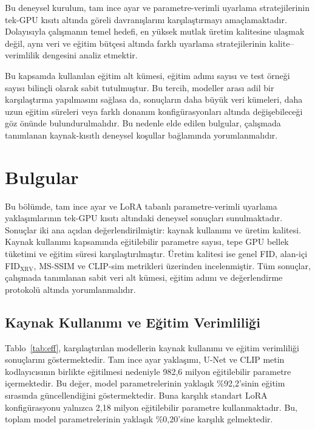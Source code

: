 \documentclass[11pt]{article}
\begin{document}
Bu deneysel kurulum, tam ince ayar ve parametre-verimli uyarlama stratejilerinin
tek-GPU kısıtı altında göreli davranışlarını karşılaştırmayı amaçlamaktadır.
Dolayısıyla çalışmanın temel hedefi, en yüksek mutlak üretim kalitesine ulaşmak
değil, aynı veri ve eğitim bütçesi altında farklı uyarlama stratejilerinin
kalite--verimlilik dengesini analiz etmektir.

Bu kapsamda kullanılan eğitim alt kümesi, eğitim adımı sayısı ve test örneği
sayısı bilinçli olarak sabit tutulmuştur. Bu tercih, modeller arası adil bir
karşılaştırma yapılmasını sağlasa da, sonuçların daha büyük veri kümeleri,
daha uzun eğitim süreleri veya farklı donanım konfigürasyonları altında
değişebileceği göz önünde bulundurulmalıdır. Bu nedenle elde edilen bulgular,
çalışmada tanımlanan kaynak-kısıtlı deneysel koşullar bağlamında
yorumlanmalıdır.


\section{Bulgular}
\label{sec:results}

Bu bölümde, tam ince ayar ve LoRA tabanlı parametre-verimli uyarlama
yaklaşımlarının tek-GPU kısıtı altındaki deneysel sonuçları sunulmaktadır.
Sonuçlar iki ana açıdan değerlendirilmiştir: kaynak kullanımı ve üretim
kalitesi. Kaynak kullanımı kapsamında eğitilebilir parametre sayısı, tepe GPU
bellek tüketimi ve eğitim süresi karşılaştırılmıştır. Üretim kalitesi ise genel
FID, alan-içi FID$_{\text{XRV}}$, MS-SSIM ve CLIP-sim metrikleri üzerinden
incelenmiştir. Tüm sonuçlar, çalışmada tanımlanan sabit veri alt kümesi, eğitim
adımı ve değerlendirme protokolü altında yorumlanmalıdır.

\subsection{Kaynak Kullanımı ve Eğitim Verimliliği}

Tablo~\ref{tab:eff}, karşılaştırılan modellerin kaynak kullanımı ve eğitim
verimliliği sonuçlarını göstermektedir. Tam ince ayar yaklaşımı, U-Net ve CLIP
metin kodlayıcısının birlikte eğitilmesi nedeniyle 982,6 milyon eğitilebilir
parametre içermektedir. Bu değer, model parametrelerinin yaklaşık \%92,2'sinin
eğitim sırasında güncellendiğini göstermektedir. Buna karşılık standart LoRA
konfigürasyonu yalnızca 2,18 milyon eğitilebilir parametre kullanmaktadır. Bu,
toplam model parametrelerinin yaklaşık \%0,20'sine karşılık gelmektedir.
\end{document}
